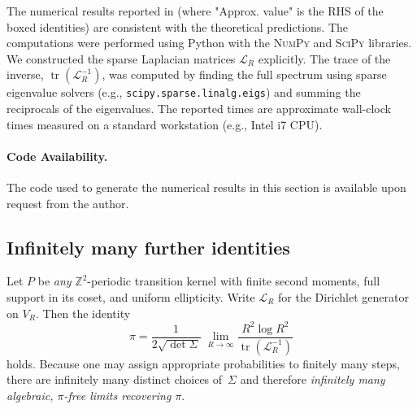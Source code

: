 \documentclass[12pt]{amsart}
\theoremstyle{definition}
\theoremstyle{remark}
\DeclareMathOperator{\tr}{tr}    %
\begin{document}
The numerical results reported in  (where "Approx. value" is the RHS of the boxed identities) are consistent with the theoretical predictions. The computations were performed using Python with the \textsc{NumPy} and \textsc{SciPy} libraries. We constructed the sparse Laplacian matrices $\mathcal{L}_R$ explicitly. The trace of the inverse, $\tr(\mathcal{L}_R^{-1})$, was computed by finding the full spectrum using sparse eigenvalue solvers (e.g., \texttt{scipy.sparse.linalg.eigs}) and summing the reciprocals of the eigenvalues. The reported times are approximate wall-clock times measured on a standard workstation (e.g., Intel i7 CPU).

\paragraph{Code Availability.} The code used to generate the numerical results in this section is available upon request from the author.


\subsection{Infinitely many further identities}\label{app:infinite}

Let \(P\) be \emph{any} $\mathbb{Z}^{2}$-periodic transition kernel
with finite second moments, full support in its coset, and
uniform ellipticity.
Write \( \mathcal{L}_R \) for the Dirichlet generator on \( V_R \).
Then the identity
\[\pi=\frac{1}{2\sqrt{\det\Sigma}}\;\lim_{R\to\infty}\frac{R^{2}\log R^{2}}{\tr(\mathcal{L}_R^{-1})}\]
holds.
Because one may assign appropriate probabilities to
finitely many steps, there are infinitely many distinct choices of~\(\Sigma\) and therefore
\emph{infinitely many algebraic, $\pi$-free limits recovering $\pi$}.
\end{document}
